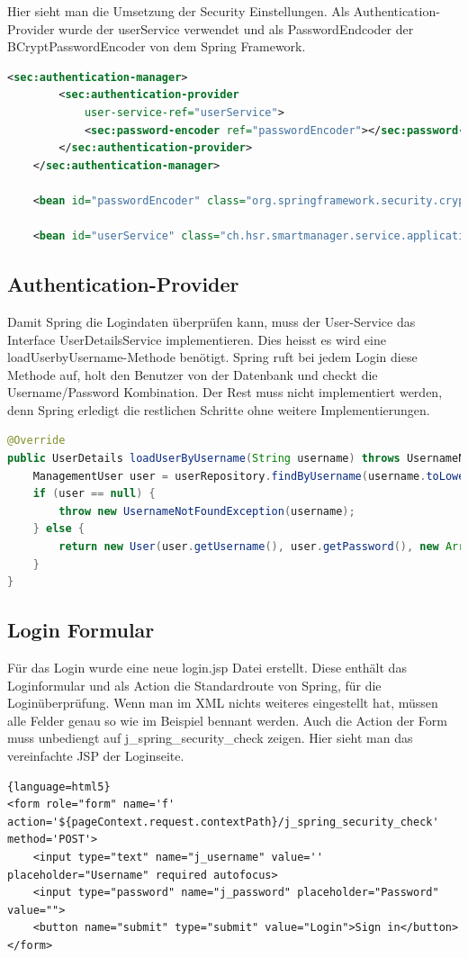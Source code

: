 Hier sieht man die Umsetzung der Security Einstellungen. Als Authentication-Provider wurde der userService verwendet und als PasswordEndcoder der BCryptPasswordEncoder von dem Spring Framework.
\begin{lstlisting}[language=xml]
<sec:authentication-manager>
		<sec:authentication-provider
			user-service-ref="userService">
			<sec:password-encoder ref="passwordEncoder"></sec:password-encoder>
		</sec:authentication-provider>
	</sec:authentication-manager>
	
	<bean id="passwordEncoder" class="org.springframework.security.crypto.bcrypt.BCryptPasswordEncoder"></bean>
	
	<bean id="userService" class="ch.hsr.smartmanager.service.applicationservices.UserService"></bean>
\end{lstlisting}

\subsection{Authentication-Provider}
Damit Spring die Logindaten überprüfen kann, muss der User-Service das Interface UserDetailsService implementieren. Dies heisst es wird eine loadUserbyUsername-Methode benötigt. Spring ruft bei jedem Login diese Methode auf, holt den Benutzer von der Datenbank und checkt die Username/Password Kombination. Der Rest muss nicht implementiert werden, denn Spring erledigt die restlichen Schritte ohne weitere Implementierungen.
\begin{lstlisting}[language=java]
@Override
public UserDetails loadUserByUsername(String username) throws UsernameNotFoundException {
	ManagementUser user = userRepository.findByUsername(username.toLowerCase());
	if (user == null) {
		throw new UsernameNotFoundException(username);
	} else {
		return new User(user.getUsername(), user.getPassword(), new ArrayList<>());
	}
}
\end{lstlisting}

	
\subsection{Login Formular}
Für das Login wurde eine neue login.jsp Datei erstellt. Diese enthält das Loginformular und als Action die Standardroute von Spring, für die Loginüberprüfung. Wenn man im XML nichts weiteres eingestellt hat, müssen alle Felder genau so wie im Beispiel bennant werden. Auch die Action der Form muss unbediengt auf j\_spring\_security\_check zeigen. Hier sieht man das vereinfachte JSP der Loginseite.
\begin{lstlisting}{language=html5}
<form role="form" name='f' action='${pageContext.request.contextPath}/j_spring_security_check' method='POST'>
	<input type="text" name="j_username" value='' placeholder="Username" required autofocus>
	<input type="password" name="j_password" placeholder="Password" value="">
	<button name="submit" type="submit" value="Login">Sign in</button>
</form>
\end{lstlisting}


